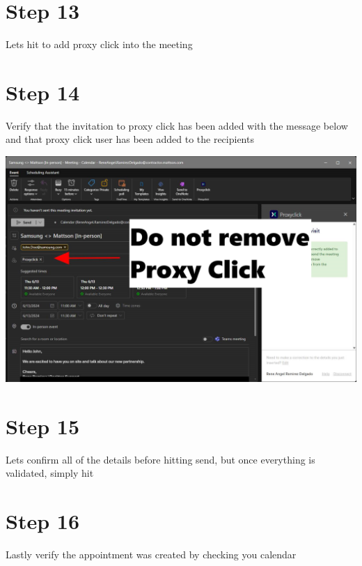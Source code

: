 \documentclass{../lib/lib-en}
\begin{document}

\newpage
\section*{\centering Step 13}
Lets hit  to add proxy click into the meeting


\newpage
\section*{\centering Step 14}
Verify that the invitation to proxy click has been added with the message below and that proxy click user has been added to the recipients

\vspace{2.5cm}
\hspace{-2.2cm}
\includegraphics[width=1.3\textwidth]{s15.png}

\newpage
\section*{\centering Step 15}
Lets confirm all of the details before hitting send, but once everything is validated, simply hit 


\newpage
\section*{\centering Step 16}
Lastly verify the appointment was created by checking you calendar

\end{document}
